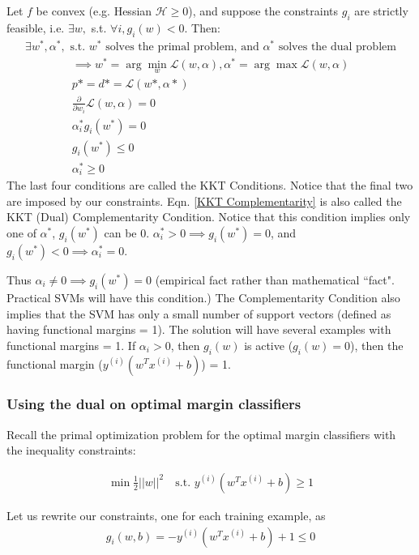 \documentclass[letterpaper,10pt]{article}
\begin{document}
Let $f$ be convex (e.g. Hessian $\mathcal{H} \geq 0$), and suppose the constraints $g_i$ are strictly feasible, i.e. $\exists w, $ s.t. $\forall i, g_i(w) < 0$. Then: 
\begin{align}
\exists w^*, \alpha^*, \text{ s.t. } w^* \text{ solves the primal problem, and } \alpha^* \text{ solves the dual problem}
\end{align}
\begin{align}
\implies w^* = \arg \min_w \mathcal{L}(w,\alpha) , \alpha^* = \arg \max \mathcal{L}(w,\alpha) \\
p* = d* = \mathcal{L}(w*,\alpha*) \\
\frac{\partial}{\partial w_i} \mathcal{L}(w,\alpha) = 0 \\
\alpha_i^*g_i(w^*) = 0 \label{KKT Complementarity} \\
g_i(w^*) \leq 0 \\
\alpha_i^* \geq 0
\end{align}
The last four conditions are called the KKT Conditions. Notice that the final two are imposed by our constraints. Eqn. \ref{KKT Complementarity} is also called the KKT (Dual) Complementarity Condition. Notice that this condition implies only one of $\alpha^*$, $g_i(w^*)$ can be 0. $\alpha_i^* > 0 \implies g_i(w^*) = 0$, and $g_i(w^*) < 0 \implies \alpha_i^* = 0$. 

Thus $\alpha_i \neq 0 \implies g_i(w^*) = 0$ (empirical fact rather than mathematical ``fact". Practical SVMs will have this condition.) The Complementarity Condition also implies that the SVM has only a small number of support vectors (defined as having functional margins = 1). The solution will have several examples with functional margins = 1. If $\alpha_i > 0$, then $g_i(w)$ is active ($g_i(w) = 0$), then the functional margin ($y^{(i)}(w^T x^{(i)} + b)$) = 1.



\subsubsection{Using the dual on optimal margin classifiers}

Recall the primal optimization problem for the optimal margin classifiers with the inequality constraints:

\begin{align}
\min \frac{1}{2} ||w||^2 \quad \text{s.t. } y^{(i)}(w^T x^{(i)} + b) \geq 1
\end{align}

Let us rewrite our constraints, one for each training example, as 
\begin{align}
g_i(w,b) = -y^{(i)} (w^T x^{(i)} + b) + 1 \leq 0
\end{align}
\end{document}
